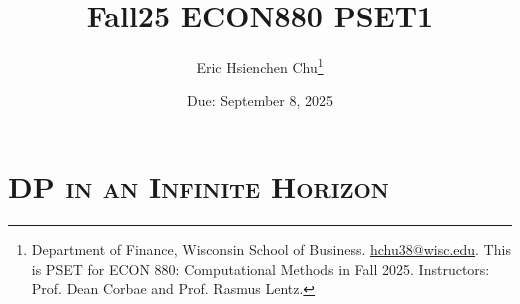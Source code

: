 \documentclass[12pt]{article}
\title{\huge Fall25 ECON880 PSET1}
\author{\Large Eric Hsienchen Chu\footnote{Department of Finance, Wisconsin School of Business. 
\href{mailto:hchu38@wisc.edu}{hchu38@wisc.edu}. 
This is PSET for ECON 880: Computational Methods in Fall 2025. 
Instructors: Prof. Dean Corbae and Prof. Rasmus Lentz.}}
\numberwithin{equation}{section}
\begin{document}
\date{\Large Due: September 8, 2025}
\maketitle
\renewcommand{\cftdot}{.}


\vspace{-4ex}

\section{\textsc{DP in an Infinite Horizon}}
%


%



%


%


%


%
\end{document}
